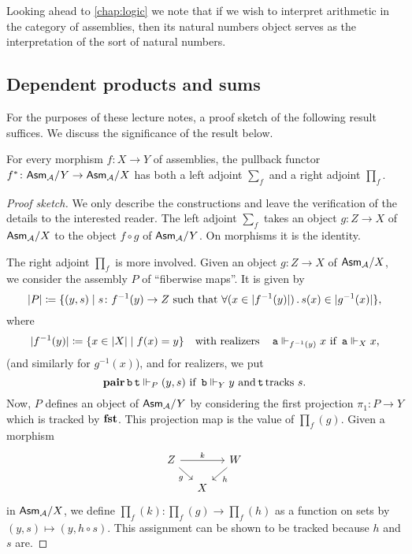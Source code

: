 Looking ahead to \cref{chap:logic} we note that if we wish to interpret
arithmetic in the category of assemblies, then its natural numbers object serves
as the interpretation of the sort of natural numbers.

\subsection{Dependent products and sums}

For the purposes of these lecture notes, a proof sketch of the following result
suffices. We discuss the significance of the result below.

\begin{proposition}\label{base-change-adjoints}
  For every morphism \(f \colon X \to Y\) of assemblies, the pullback functor
  \(f^\ast \colon \mathsf{Asm}_{\mathcal A}/Y \to \mathsf{Asm}_{\mathcal A}/X\) has both a left adjoint
  \(\sum_f\) and a right adjoint \(\prod_f\).
\end{proposition}
\begin{proof}[Proof sketch]
  We only describe the constructions and leave the verification of the details
  to the interested reader.
  The left adjoint \(\sum_f\) takes an object \(g \colon Z \to X\) of
  \(\mathsf{Asm}_{\mathcal A}/X\) to the object \(f \circ g\) of \(\mathsf{Asm}_{\mathcal A}/Y\).
  On morphisms it is the identity.

  The right adjoint \(\prod_f\) is more involved.
  Given an object \(g \colon Z \to X\) of \(\mathsf{Asm}_{\mathcal A}/X\), we consider the
  assembly \(P\) of ``fiberwise maps''. It is given by
  \[
    \lvert P\rvert \coloneq
    \{(y,s) \mid s \colon f^{-1}(y) \to Z \text{ such that }
      \forall(x \in \lvert f^{-1}(y)\rvert)\,.\,s(x) \in \lvert g^{-1}(x)\rvert\},
  \]
  where
  \[
    \lvert f^{-1}(y)\rvert \coloneq \{x \in \lvert X\rvert \mid f(x) = y\}
    \quad\text{with realizers}\quad
    \operatorname{\mathtt{a}} \Vdash_{f^{-1}(y)} x \text{ if } \operatorname{\mathtt{a}} \Vdash_X x,
  \]
  (and similarly for \(g^{-1}(x)\)), and for realizers, we put
  \[
    \operatorname{\mathbf{pair}}\operatorname{\mathtt{b}}\operatorname{\mathtt{t}} \Vdash_P (y,s)
    \text{ if }
    \operatorname{\mathtt{b}} \Vdash_Y y
    \text{ and}
    \operatorname{\mathtt{t}} \text{tracks } s.
  \]
  Now, \(P\) defines an object of \(\mathsf{Asm}_{\mathcal A}/Y\) by considering the first
  projection \(\pi_1 \colon P \to Y\) which is tracked by \(\operatorname{\mathbf{fst}}\).
  This projection map is the value of \(\prod_f(g)\).
  Given a morphism
  \[
    \begin{tikzcd}[row sep=4mm,column sep=4mm]
      Z \ar[rr,"k"] \ar[dr,"g"'] & & W \ar[dl,"h"] \\
      & X
    \end{tikzcd}
  \]
  in \(\mathsf{Asm}_{\mathcal A}/X\), we define \(\prod_f(k) \colon \prod_f(g) \to \prod_f(h)\)
  as a function on sets by \((y,s) \mapsto (y, h \circ s)\). This assignment can
  be shown to be tracked because \(h\) and \(s\) are.
\end{proof}

